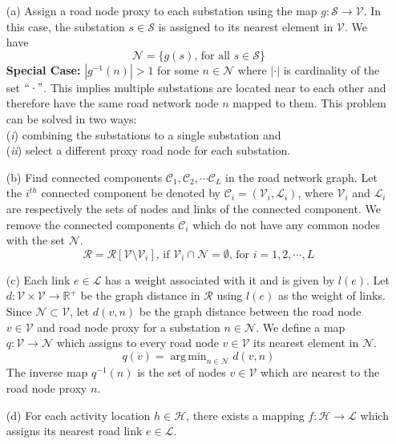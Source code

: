 \documentclass[12pt]{article}
\DeclareMathOperator*{\argmin}{arg\,min}
\begin{document}
	\begin{enumerate}
		\item[(a)] Assign a road node proxy to each substation using the map $g:\mathcal{S}\rightarrow \mathcal{V}$. In this case, the substation $s\in\mathcal{S}$ is assigned to its nearest element in $\mathcal{V}$. We have
		\begin{equation}\mathcal{N}=\{g(s)\textrm{, for all }s\in\mathcal{S}\}\end{equation} 
		\textbf{Special Case:} $|g^{-1}(n)|>1$ for some $n\in\mathcal{N}$ where $|\cdot|$ is cardinality of the set $``\cdot"$. This implies multiple substations are located near to each other and therefore have the same road network node $n$ mapped to them. This problem can be solved in two ways:\\
		(\textit{i}) combining the substations to a single substation and\\
		(\textit{ii}) select a different proxy road node for each substation.
		\item[(b)] Find connected components $\mathcal{C}_1,\mathcal{C}_2,\cdots\mathcal{C}_L$ in the road network graph. Let the $i^{th}$ connected component be denoted by $\mathcal{C}_i=(\mathcal{V}_i,\mathcal{L}_i)$, where $\mathcal{V}_i$ and $\mathcal{L}_i$ are respectively the sets of nodes and links of the connected component. We remove the connected components $\mathcal{C}_i$ which do not have any common nodes with the set $\mathcal{N}$. 
		\begin{equation}\mathcal{R}=\mathcal{R}[\mathcal{V}\setminus\mathcal{V}_i]\textrm{, if }\mathcal{V}_i\cap\mathcal{N}=\emptyset\textrm{, for }i=1,2,\cdots,L\end{equation}
		\item[(c)] Each link $e\in\mathcal{L}$ has a weight associated with it and is given by $l(e)$. Let $d:\mathcal{V}\times\mathcal{V}\rightarrow\mathbb{R}^{+}$ be the graph distance in $\mathcal{R}$ using $l(e)$ as the weight of links. Since $\mathcal{N}\subset\mathcal{V}$, let $d(v,n)$ be the graph distance between the road node $v\in\mathcal{V}$ and road node proxy for a substation $n\in\mathcal{N}$. We define a map $q:\mathcal{V}\rightarrow\mathcal{N}$ which assigns to every road node $v\in\mathcal{V}$ its nearest element in $\mathcal{N}$.
		\begin{equation}q(v)=\argmin_{n\in\mathcal{N}}{d(v,n)}\end{equation}
		The inverse map $q^{-1}(n)$ is the set of nodes $v\in\mathcal{V}$ which are nearest to the road node proxy $n$.
		\item[(d)] For each activity location $h\in\mathcal{H}$, there exists a mapping $f:\mathcal{H}\rightarrow\mathcal{L}$ which assigns its nearest road link $e\in\mathcal{L}$.
	\end{enumerate}
\end{document}
